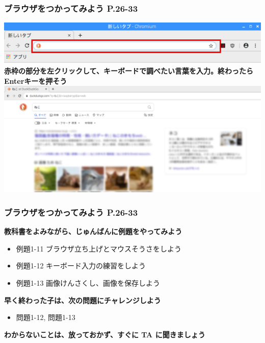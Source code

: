 \documentclass[dvipdfmx]{beamer}
\begin{document}
\begin{frame}[fragile]
	\frametitle{ブラウザをつかってみよう P.26-33~~~}
  \includegraphics[width=\textwidth]{slide02_005.png}
  \vfill
  \large\textbf{赤枠の部分を左クリックして、キーボードで調べたい言葉を入力。終わったらEnterキーを押そう}\\
  \vfill
  \includegraphics[width=\textwidth]{slide02_006.png}\\
\end{frame}

\begin{frame}[fragile]
	\frametitle{ブラウザをつかってみよう P.26-33~~~}
    \large\textbf{教科書をよみながら、じゅんばんに例題をやってみよう}
    				\begin{itemize}
    					\item 例題1-11 ブラウザ立ち上げとマウスそうさをしよう
    					\item 例題1-12 キーボード入力の練習をしよう
    					\item 例題1-13 画像けんさくし、画像を保存しよう
    				\end{itemize}
          \vfill
          \large\textbf{早く終わった子は、次の問題にチャレンジしよう}
          \begin{itemize}
            \item 問題1-12, 問題1-13
          \end{itemize}
          \vfill
          \large\textbf{わからないことは、放っておかず、すぐに TA に聞きましょう}
\end{frame}
\end{document}
